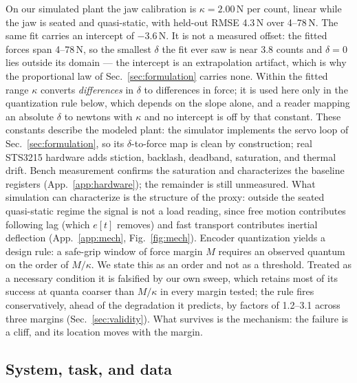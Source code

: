 \documentclass{article}
\begin{document}
On our simulated plant the jaw calibration is $\kappa = 2.00$\,N per
count, linear while the jaw is seated and quasi-static, with held-out
RMSE 4.3\,N over 4--78\,N. The same fit carries an intercept of
$-3.6$\,N. It is not a measured offset: the fitted forces span
4--78\,N, so the smallest $\delta$ the fit ever saw is near 3.8 counts and
$\delta = 0$ lies outside its domain --- the intercept is an
extrapolation artifact, which is why the proportional law of
Sec.~\ref{sec:formulation} carries none. Within the fitted range $\kappa$
converts \emph{differences} in $\delta$ to differences in force; it is used here only in the quantization rule
below, which depends on the slope alone, and a reader mapping an absolute
$\delta$ to newtons with $\kappa$ and no intercept is off by that
constant. These constants describe the modeled plant:
the simulator implements the servo loop of Sec.~\ref{sec:formulation}, so
its $\delta$-to-force map is clean by construction; real STS3215 hardware
adds stiction, backlash, deadband, saturation, and thermal drift. Bench
measurement confirms the saturation and characterizes the baseline
registers (App.~\ref{app:hardware}); the remainder is still unmeasured. What
simulation can characterize is the structure of the proxy: outside the
seated quasi-static regime the signal is not a load reading, since free
motion contributes following lag (which $e[t]$ removes) and fast
transport contributes inertial deflection
(App.~\ref{app:mech}, Fig.~\ref{fig:mech}). Encoder quantization yields a
design rule: a safe-grip window of force margin $M$ requires an observed
quantum on the order of $M / \kappa$. We state this as an order and not as
a threshold. Treated as a necessary condition it is falsified by our own
sweep, which retains most of its success at quanta coarser than
$M / \kappa$ in every margin tested; the rule fires conservatively, ahead
of the degradation it predicts, by factors of 1.2--3.1 across three
margins (Sec.~\ref{sec:validity}). What survives is the mechanism: the
failure is a cliff, and its location moves with the margin.

\subsection{System, task, and data}
\label{sec:system}
\end{document}
